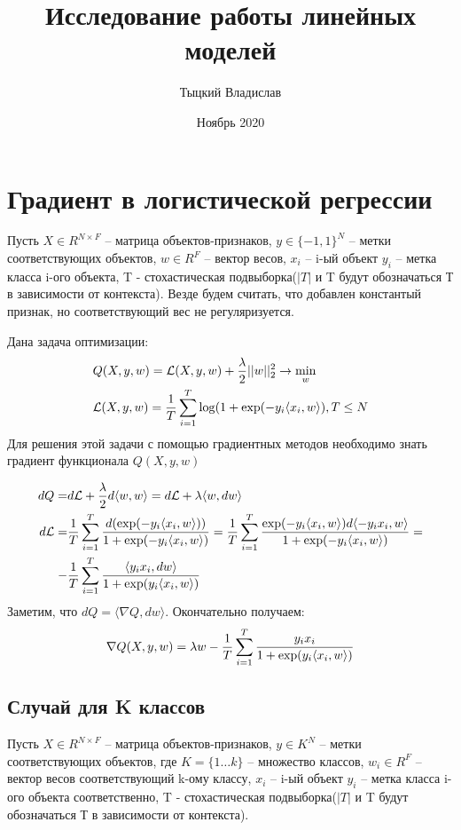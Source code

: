 \documentclass[12pt,fleqn]{article}
\title{Исследование работы линейных моделей}
\author{Тыцкий Владислав}
\date{Ноябрь 2020}
\begin{document}
\maketitle
\section{Градиент в логистической регрессии}
Пусть $X \in R^{N\times F}$ -- матрица объектов-признаков, $y \in \{-1,1\}^N$ -- метки соответствующих
объектов, $w \in R^F$ -- вектор весов, $x_i$ -- i-ый объект $ y_i$ -- метка класса i-ого
объекта,  T - стохастическая подвыборка($|T|$ и T будут обозначаться Т в зависимости от контекста).
Везде будем считать, что добавлен константый признак, но соответствующий вес не регуляризуется.

Дана задача оптимизации:
\begin{align}
    \notag & Q(X,y,w) = \mathcal{L}(X,y,w)+\frac{\lambda}{2}||w||_2^2 \rightarrow \min_{w} \\
    \notag & \mathcal{L}(X,y,w) = \frac{1}{T}\sum_{i=1}^{T}\log(1+\exp(-y_i\langle x_i, w\rangle), T \leq N
\end{align}
Для решения этой задачи с помощью градиентных методов необходимо знать градиент функционала $Q(X,y,w)$

\begin{align}
    \notag dQ = &d\mathcal{L} + \frac{\lambda}{2}d\langle w,w \rangle = d\mathcal{L} + \lambda\langle w, dw \rangle \\
    \notag d\mathcal{L} = &\frac{1}{T}\sum_{i=1}^{T}\frac{d(\exp(-y_i\langle x_i, w\rangle))}{1+\exp(-y_i\langle x_i, w\rangle)} =
    \frac{1}{T}\sum_{i=1}^{T}\frac{\exp(-y_i\langle x_i, w\rangle)d\langle-y_ix_i,w\rangle}{1+\exp(-y_i\langle x_i, w\rangle)} = \\
    \notag -&\frac{1}{T}\sum_{i=1}^{T}\frac{\langle y_ix_i,dw\rangle}{1+\exp(y_i\langle x_i, w\rangle)} 
\end{align}
Заметим, что $dQ = \langle \nabla Q,dw\rangle$. Окончательно получаем:
\begin{align}
    \notag \nabla Q(X,y,w) = \lambda w -\frac{1}{T}\sum_{i=1}^{T}\frac{y_ix_i}{1+\exp(y_i\langle x_i, w\rangle)} 
\end{align}
\subsection{Случай для K классов}
Пусть $X \in R^{N\times F}$ -- матрица объектов-признаков, $y \in K^N$ -- метки соответствующих
объектов, где $K=\{1\dots k\}$ -- множество классов, $w_i \in R^F$ -- вектор весов соответствующий k-ому классу, 
$x_i$ -- i-ый объект $ y_i$ -- метка класса i-ого
объекта соответственно, T - стохастическая подвыборка($|T|$ и T будут обозначаться 
Т в зависимости от контекста).
\end{document}
